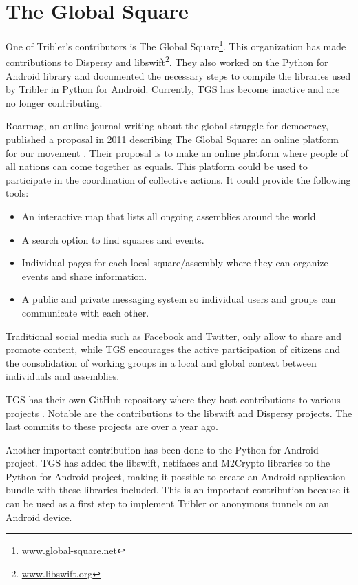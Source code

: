 \section{The Global Square}
	\label{sec:tgs}
	One of Tribler's contributors is The Global Square\footnote{\href{http://www.global-square.net/}{www.global-square.net}}. This organization has made contributions to Dispersy and libswift\footnote{\href{http://libswift.org/}{www.libswift.org}}. They also worked on the Python for Android library and documented the necessary steps to compile the libraries used by Tribler in Python for Android. Currently, TGS has become inactive and are no longer contributing.
	
	Roarmag, an online journal writing about the global struggle for democracy, published a proposal in 2011 describing The Global Square: an online platform for our movement \cite{theglobalsquare}. Their proposal is to make an online platform where people of all nations can come together as equals. This platform could be used to participate in the coordination of collective actions. It could provide the following tools:
	\begin{itemize}
		\item An interactive map that lists all ongoing assemblies around the world.
		\item A search option to find squares and events.
		\item Individual pages for each local square/assembly where they can organize events and share information.
		\item A public and private messaging system so individual users and groups can communicate with each other.
	\end{itemize}
	Traditional social media such as Facebook and Twitter, only allow to share and promote content, while TGS encourages the active participation of citizens and the consolidation of working groups in a local and global context between individuals and assemblies.
	
	TGS has their own GitHub repository where they host contributions to various projects \cite{theglobalsquaregithub}. Notable are the contributions to the libswift and Dispersy projects. The last commits to these projects are over a year ago.
		
	Another important contribution has been done to the Python for Android project. TGS has added the libswift, netifaces and M2Crypto libraries to the Python for Android project, making it possible to create an Android application bundle with these libraries included. This is an important contribution because it can be used as a first step to implement Tribler or anonymous tunnels on an Android device.

